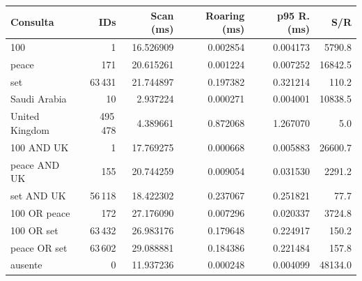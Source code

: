 \begin{tabular}{lrrrrr}
\toprule
Consulta & IDs & Scan (ms) & Roaring (ms) & p95 R. (ms) & S/R \\
\midrule
100 & 1 & 16.526909 & 0.002854 & 0.004173 & 5790.8 \\
peace & 171 & 20.615261 & 0.001224 & 0.007252 & 16842.5 \\
set & 63\,431 & 21.744897 & 0.197382 & 0.321214 & 110.2 \\
Saudi Arabia & 10 & 2.937224 & 0.000271 & 0.004001 & 10838.5 \\
United Kingdom & 495\,478 & 4.389661 & 0.872068 & 1.267070 & 5.0 \\
100 AND UK & 1 & 17.769275 & 0.000668 & 0.005883 & 26600.7 \\
peace AND UK & 155 & 20.744259 & 0.009054 & 0.031530 & 2291.2 \\
set AND UK & 56\,118 & 18.422302 & 0.237067 & 0.251821 & 77.7 \\
100 OR peace & 172 & 27.176090 & 0.007296 & 0.020337 & 3724.8 \\
100 OR set & 63\,432 & 26.983176 & 0.179648 & 0.224917 & 150.2 \\
peace OR set & 63\,602 & 29.088881 & 0.184386 & 0.221484 & 157.8 \\
ausente & 0 & 11.937236 & 0.000248 & 0.004099 & 48134.0 \\
\bottomrule
\end{tabular}
